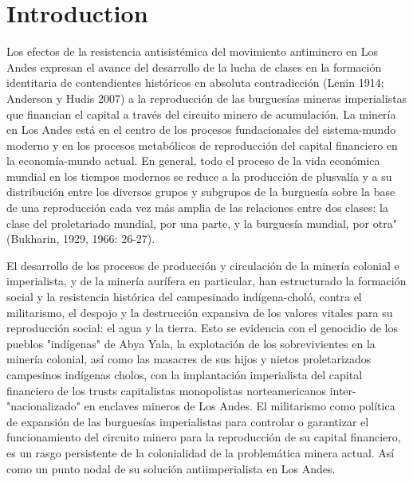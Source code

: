 \documentclass[]{interact}
\theoremstyle{plain}%
\theoremstyle{definition}
\theoremstyle{remark}
\begin{document}
\section{Introduction}
Los efectos de la resistencia antisistémica del movimiento antiminero en Los Andes expresan el avance del desarrollo de la lucha de clases en la formación identitaria de contendientes históricos en absoluta contradicción (Lenin 1914; Anderson y Hudis 2007) a la reproducción de las burguesías mineras imperialistas que financian el capital a través del circuito minero de acumulación. La minería en Los Andes está en el centro de los procesos fundacionales del sistema-mundo moderno y en los procesos metabólicos de reproducción del capital financiero en la economía-mundo actual. En general, todo el proceso de la vida económica mundial en los tiempos modernos se reduce a la producción de plusvalía y a su distribución entre los diversos grupos y subgrupos de la burguesía sobre la base de una reproducción cada vez más amplia de las relaciones entre dos clases: la clase del proletariado mundial, por una parte, y la burguesía mundial, por otra" (Bukharin, 1929, 1966: 26-27). 

El desarrollo de los procesos de producción y circulación de la minería colonial e imperialista, y de la minería aurífera en particular, han estructurado la formación social y la resistencia histórica del campesinado indígena-choló, contra el militarismo, el despojo y la destrucción expansiva de los valores vitales para su reproducción social: el agua y la tierra. Esto se evidencia con el genocidio de los pueblos "indígenas" de Abya Yala, la explotación de los sobrevivientes en la minería colonial, así como las masacres de sus hijos y nietos proletarizados campesinos indígenas cholos, con la implantación imperialista del capital financiero de los trusts capitalistas monopolistas norteamericanos inter-"nacionalizado" en enclaves mineros de Los Andes. El militarismo como política de expansión de las burguesías imperialistas para controlar o garantizar el funcionamiento del circuito minero para la reproducción de su capital financiero, es un rasgo persistente de la colonialidad de la problemática minera actual. Así como un punto nodal de su solución antiimperialista en Los Andes. 
\end{document}
